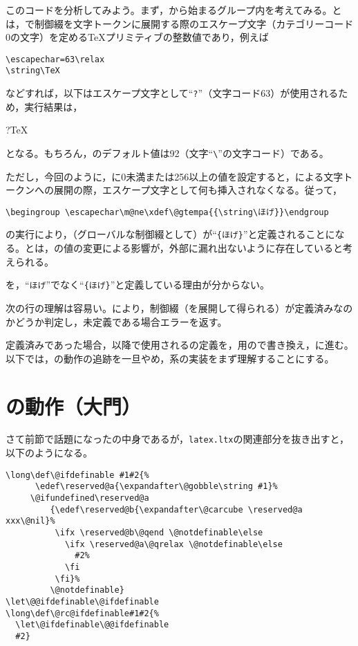\documentclass[autodetect-engine,dvipdfmx]{jsarticle}
\begin{document}
このコードを分析してみよう。まず，から始まるグループ内を考えてみる。とは，で制御綴を文字トークンに展開する際のエスケープ文字（カテゴリーコード0の文字）を定める\TeX プリミティブの整数値であり，例えば
\begin{lstlisting}
\escapechar=63\relax
\string\TeX
\end{lstlisting}
などすれば，以下はエスケープ文字として``\texttt{?}''（文字コード63）が使用されるため，実行結果は，

?TeX

となる。もちろん，のデフォルト値は92（文字``\verb|\|''の文字コード）である。

ただし，今回のように，に0未満または256以上の値を設定すると，による文字トークンへの展開の際，エスケープ文字として何も挿入されなくなる。従って，
\begin{lstlisting}
\begingroup \escapechar\m@ne\xdef\@gtempa{{\string\ほげ}}\endgroup
\end{lstlisting}
の実行により，（グローバルな制御綴として）が``\texttt{\{ほげ\}}''と定義されることになる。とは，の値の変更による影響が，外部に漏れ出ないように存在していると考えられる。

\begin{question}
を，``\texttt{ほげ}''でなく``\texttt{\{ほげ\}}''と定義している理由が分からない。
\end{question}


次の行の理解は容易い。により，制御綴（を展開して得られる）が定義済みなのかどうか判定し，未定義である場合エラーを返す。

定義済みであった場合，以降で使用されるの定義を，用ので書き換え，に進む。以下では，の動作の追跡を一旦やめ，系の実装をまず理解することにする。

\section{の動作（大門）}

さて前節で話題になったの中身であるが，\texttt{latex.ltx}の関連部分を抜き出すと，以下のようになる。
\latexltx
\begin{lstlisting}[firstnumber=649]
\long\def\@ifdefinable #1#2{%
      \edef\reserved@a{\expandafter\@gobble\string #1}%
     \@ifundefined\reserved@a
         {\edef\reserved@b{\expandafter\@carcube \reserved@a xxx\@nil}%
          \ifx \reserved@b\@qend \@notdefinable\else
            \ifx \reserved@a\@qrelax \@notdefinable\else
              #2%
            \fi
          \fi}%
         \@notdefinable}
\let\@@ifdefinable\@ifdefinable
\long\def\@rc@ifdefinable#1#2{%
  \let\@ifdefinable\@@ifdefinable
  #2}
\end{lstlisting}
\end{document}
